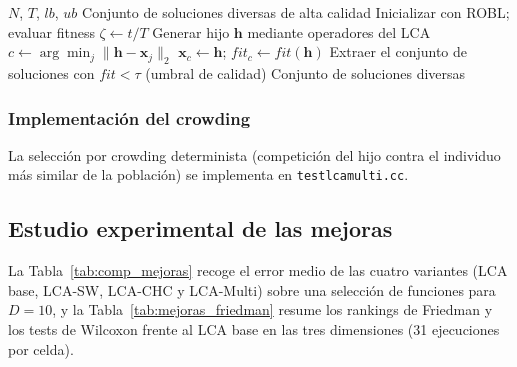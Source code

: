 \begin{algorithm}[H]
\caption{LCA Multimodal con Crowding Determinista}
\label{alg:lcamulti}
\begin{algorithmic}[1]
\Require $N$, $T$, $lb$, $ub$
\Ensure Conjunto de soluciones diversas de alta calidad
\State Inicializar con ROBL; evaluar fitness
  \State $\zeta \leftarrow t/T$
    \State Generar hijo $\mathbf{h}$ mediante operadores del LCA
    \State $c \leftarrow \arg\min_{j} \|\mathbf{h} - \mathbf{x}_j\|_2$ 
      \State $\mathbf{x}_c \leftarrow \mathbf{h}$; $fit_c \leftarrow fit(\mathbf{h})$ 
    \EndIf
  \EndFor
\EndFor
\State Extraer el conjunto de soluciones con $fit < \tau$ (umbral de calidad)
\State \Return Conjunto de soluciones diversas
\end{algorithmic}
\end{algorithm}

\subsubsection{Implementación del crowding}

La selecci\'on por crowding determinista (competici\'on del hijo contra el individuo m\'as similar de la poblaci\'on) se implementa en \texttt{testlcamulti.cc}.

\subsection{Estudio experimental de las mejoras}

La Tabla~\ref{tab:comp_mejoras} recoge el error medio de las cuatro variantes (LCA base,
LCA-SW, LCA-CHC y LCA-Multi) sobre una selección de funciones para $D=10$, y la
Tabla~\ref{tab:mejoras_friedman} resume los rankings de Friedman y los tests de Wilcoxon
frente al LCA base en las tres dimensiones (31 ejecuciones por celda).

